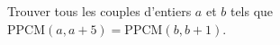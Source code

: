 Trouver tous les couples d'entiers $a$ et $b$ tels que $\mathrm{PPCM}(a, a+5) = \mathrm{PPCM}(b, b+1)$.
